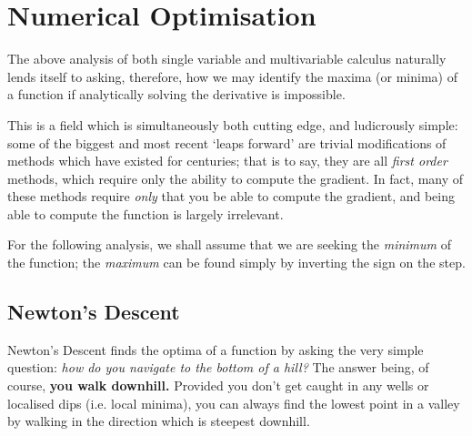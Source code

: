 \documentclass[a4paper,openany,11pt]{book}
\renewcommand\vec[1]{\boldsymbol{\mathbf{#1}}}
\begin{document}

		
		\chapter{Numerical Optimisation}\label{C:Optimisation}
	
			The above analysis of both single variable and multivariable calculus naturally lends itself to asking, therefore, how we may identify the maxima (or minima) of a function if analytically solving the derivative is impossible. 
	
			This is a field which is simultaneously both cutting edge, and ludicrously simple: some of the biggest and most recent `leaps forward' are trivial modifications of methods which have existed for centuries; that is to say, they are all \textit{first order} methods, which require only the ability to compute the gradient. In fact, many of these methods require \textit{only} that you be able to compute the gradient, and being able to compute the function is largely irrelevant. 
	
			For the following analysis, we shall assume that we are seeking the \textit{minimum} of the function; the \textit{maximum} can be found simply by inverting the sign on the step. 
			
			\section{Newton's Descent}
				Newton's Descent finds the optima of a function by asking the very simple question: \textit{how do you navigate to the bottom of a hill?} The answer being, of course, \textbf{you walk downhill.} Provided you don't get caught in any wells or localised dips (i.e. local minima), you can always find the lowest point in a valley by walking in the direction which is steepest downhill. 
	
\end{document}

